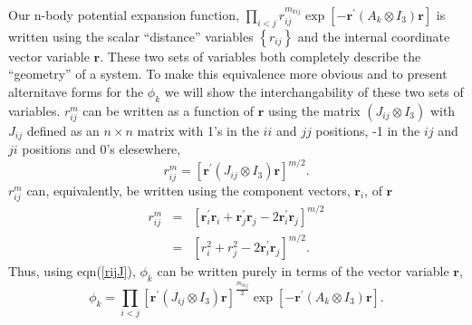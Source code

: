\documentclass[12pt,thmsa]{article}
\begin{document}
Our n-body potential expansion function, $\prod_{i<j}r_{ij}^{m_{kij}}\exp
\left[ -\mathbf{r}^{\prime }(A_k\otimes I_3)\mathbf{r}\right] $ is written
using the scalar ``distance'' variables $\left\{ r_{ij}\right\} $ and the
internal coordinate vector variable $\mathbf{r.}$ These two sets of
variables both completely describe the ``geometry'' of a system. To make
this equivalence more obvious and to present alternitave forms for the $\phi
_k$ we will show the interchangability of these two sets of variables. $%
r_{ij}^m$ can be written as a function of $\mathbf{r}$ using the matrix $%
\left( J_{ij}\otimes I_3\right) $ with $J_{ij}$ defined as an $n\times n$
matrix with 1's in the $ii$ and $jj$ positions, -1 in the $ij$ and $ji$
positions and 0's elesewhere\cite{Poshusta83 Kinghorn95a}, 
\begin{equation}
r_{ij}^m=\left[ \mathbf{r}^{\prime }(J_{ij}\otimes I_3)\mathbf{r}\right]
^{m/2}.  \label{rijJ}
\end{equation}
$r_{ij}^m$ can, equivalently, be written using the component vectors, $%
\mathbf{r}_i$, of $\mathbf{r}$ 
\begin{eqnarray}
r_{ij}^m &=&\left[ \mathbf{r}_i^{\prime }\mathbf{r}_i+\mathbf{r}_j^{\prime }%
\mathbf{r}_j-2\mathbf{r}_i^{\prime }\mathbf{r}_j\right] ^{m/2} \\
&=&\left[ r_i^2+r_j^2-2\mathbf{r}_i^{\prime }\mathbf{r}_j\right] ^{m/2}.
\end{eqnarray}
Thus, using eqn(\ref{rijJ}), $\phi _k$ can be written purely in terms of the
vector variable $\mathbf{r}$, 
\begin{equation}
\phi _k=\prod_{i<j}\left[ \mathbf{r}^{\prime }(J_{ij}\otimes I_3)\mathbf{r}%
\right] ^{\frac{m_{kij}}2}\exp \left[ -\mathbf{r}^{\prime }(A_k\otimes I_3)%
\mathbf{r}\right] .  \label{phir}
\end{equation}
\end{document}

